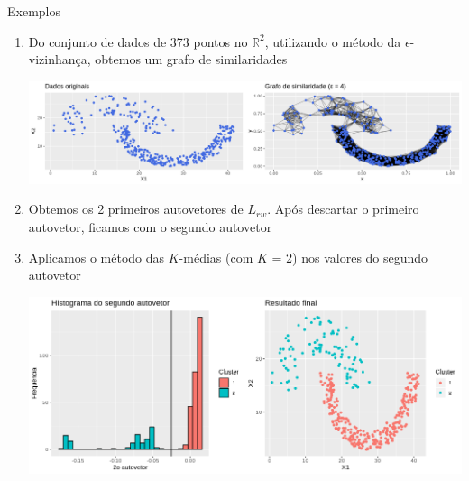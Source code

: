 \documentclass[11pt]{beamer}
\newcommand{\R}{\mathbb{R}}
\begin{document}
\begin{frame}{Exemplos}
\begin{enumerate}

\item Do conjunto de dados de 373 pontos no $\R^2$, utilizando o método da $\epsilon$-vizinhança, obtemos um grafo de similaridades

\includegraphics[scale=0.34]{horse}

\item Obtemos os 2 primeiros autovetores de $L_{rw}$. Após descartar o primeiro autovetor, ficamos com o segundo autovetor

\end{enumerate}

\end{frame}

\begin{frame}
\begin{enumerate}
\setcounter{enumi}{2}

\item Aplicamos o método das $K$-médias (com $K$ = 2) nos valores do segundo autovetor

\vspace{1cm}

\includegraphics[scale=0.4]{final}

\end{enumerate}
\end{frame}
\end{document}
